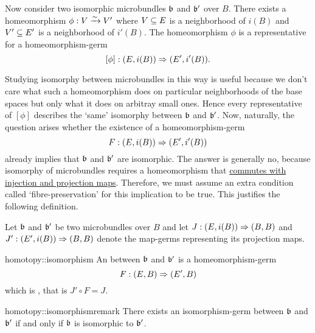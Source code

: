\begin{myparagraph}
    Now consider two isomorphic microbundles $\mathfrak{b}$ and $\mathfrak{b}'$ over $B$.
    There exists a homeomorphism $\phi: V \xrightarrow{\sim} V'$ where $V \subseteq{} E$ is a neighborhood of $i(B)$ and $V' \subseteq{} E'$ is a neighborhood of $i'(B)$.
    The homeomorphism $\phi$ is a representative for a homeomorphism-germ
    \[ [\phi]: (E, i(B)) \Rightarrow{} (E', i'(B)). \]
    
    Studying isomorphy between microbundles in this way is useful because we don't care what such a
    homeomorphism does on particular neighborhoods of the base spaces but only what it does on arbitray small ones.
    Hence every representative of $[\phi]$ describes the `same' isomorphy between $\mathfrak{b}$ and $\mathfrak{b}'$.
    Now, naturally, the question arises whether the existence of a homeomorphism-germ
    \[ F: (E, i(B)) \Rightarrow{} (E', i'(B)) \]
    already implies that $\mathfrak{b}$ and $\mathfrak{b}'$ are isomorphic.
    The answer is generally no, because isomorphy of microbundles requires 
    a homeomorphism that \ul{commutes with injection and projection maps}.
    Therefore, we must assume an extra condition called `fibre-preservation' for this implication to be true.
    This justifies the following definition.
    
    Let $\mathfrak{b}$ and $\mathfrak{b}'$ be two microbundles over $B$ and
    let $J: (E, i(B)) \Rightarrow{} (B, B)$ and $J': (E', i(B)) \Rightarrow{} (B, B)$ denote the map-germs representing its projection maps.
\end{myparagraph}

\begin{mydefinition}{homotopy::isomorphism}
    An  between $\mathfrak{b}$ and $\mathfrak{b}'$ is a homeomorphism-germ 
    \[ F: (E, B) \Rightarrow{} (E', B) \]
    which is , that is $J' \circ F = J$.
\end{mydefinition}

\begin{myremark}{homotopy::isomorphismremark}
    There exists an isomorphism-germ between $\mathfrak{b}$ and $\mathfrak{b}'$ if and only if $\mathfrak{b}$ is isomorphic to $\mathfrak{b}'$.
\end{myremark}